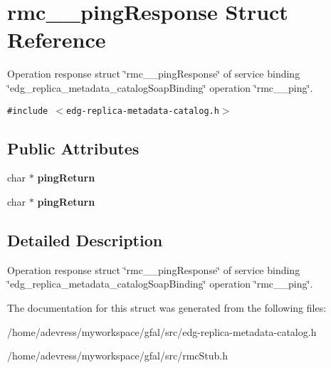 \section{rmc\_\-\_\-ping\-Response Struct Reference}
\label{structrmc____pingResponse}
Operation response struct \char`\"{}rmc\_\-\_\-ping\-Response\char`\"{} of service binding \char`\"{}edg\_\-replica\_\-metadata\_\-catalog\-Soap\-Binding\char`\"{} operation \char`\"{}rmc\_\-\_\-ping\char`\"{}.  


{\tt \#include $<$edg-replica-metadata-catalog.h$>$}

\subsection*{Public Attributes}
\begin{CompactItemize}
\item 
char $\ast$ \textbf{ping\-Return}\label{structrmc____pingResponse_5d2ea03dc0e53f7780704062edfebbd9}

\item 
char $\ast$ \textbf{ping\-Return}\label{structrmc____pingResponse_5d2ea03dc0e53f7780704062edfebbd9}

\end{CompactItemize}


\subsection{Detailed Description}
Operation response struct \char`\"{}rmc\_\-\_\-ping\-Response\char`\"{} of service binding \char`\"{}edg\_\-replica\_\-metadata\_\-catalog\-Soap\-Binding\char`\"{} operation \char`\"{}rmc\_\-\_\-ping\char`\"{}. 



The documentation for this struct was generated from the following files:\begin{CompactItemize}
\item 
/home/adevress/myworkspace/gfal/src/edg-replica-metadata-catalog.h\item 
/home/adevress/myworkspace/gfal/src/rmc\-Stub.h\end{CompactItemize}
